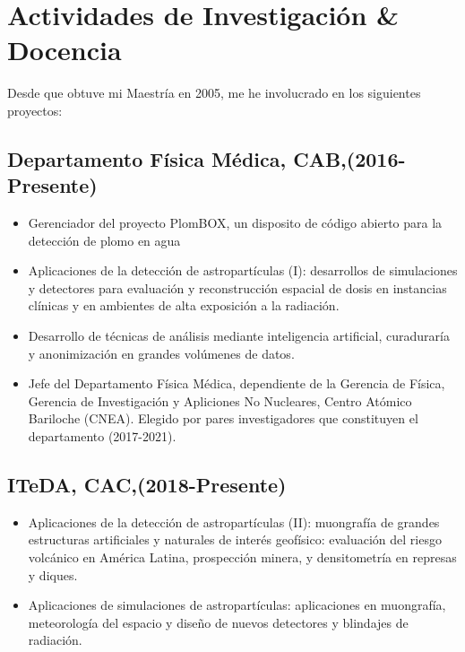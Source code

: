 \section*{Actividades de Investigación \& Docencia}

Desde que obtuve mi Maestría en 2005, me he involucrado en los siguientes proyectos:

\subsection*{Departamento Física Médica, CAB,(2016-Presente)}
\begin{itemize}
	\item Gerenciador del proyecto PlomBOX, un disposito de código abierto para la detección de plomo en agua
	\item Aplicaciones de la detección de astropartículas (I): desarrollos
		de simulaciones y detectores para evaluación y reconstrucción
		espacial de dosis en instancias clínicas y en ambientes de
		alta exposición a la radiación.
	\item Desarrollo de técnicas de análisis mediante inteligencia artificial, curaduraría y anonimización en grandes volúmenes de datos.
 	\item Jefe del Departamento Física Médica, dependiente de la
		Gerencia de Física, Gerencia de Investigación y Apliciones No
		Nucleares, Centro Atómico Bariloche (CNEA). Elegido por pares
		investigadores que constituyen el departamento (2017-2021).
\end{itemize}

\subsection*{ITeDA, CAC,(2018-Presente)}
\begin{itemize}
	\item Aplicaciones de la detección de astropartículas (II): muongrafía de grandes estructuras artificiales y naturales de interés geofísico: evaluación del riesgo volcánico en América Latina, prospección minera, y densitometría en represas y diques.
	\item Aplicaciones de simulaciones de astropartículas: aplicaciones en muongrafía, meteorología del espacio y diseño de nuevos detectores y blindajes de radiación.
\end{itemize}

